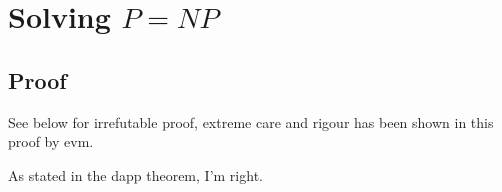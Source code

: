 \chapter{Solving $P=NP$}

\section{Proof}
See below for irrefutable proof, extreme care and rigour has been shown in this proof by \gls{evm}.\par



As stated in the \gls{dapp} theorem, I'm right.
